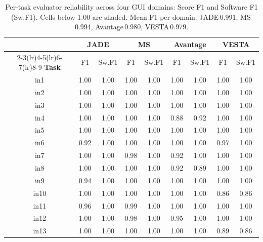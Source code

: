 \documentclass{article}
\begin{document}
\newcommand{\lo}[1]{\cellcolor{subperfect}#1}   %

\begin{table}[htbp]
\centering
\caption{Per-task evaluator reliability across four GUI domains: Score F1 and Software F1 (Sw.F1).
  Cells below 1.00 are shaded. Mean F1 per domain: JADE\,0.991, MS\,0.994, Avantage\,0.980, VESTA\,0.979.}
\label{tab:per_task_detail}
\small
\setlength{\tabcolsep}{5pt}
\begin{tabular}{c cc cc cc cc}
\toprule
 & \multicolumn{2}{c}{\textbf{JADE}}
 & \multicolumn{2}{c}{\textbf{MS}}
 & \multicolumn{2}{c}{\textbf{Avantage}}
 & \multicolumn{2}{c}{\textbf{VESTA}} \\
\cmidrule(lr){2-3}\cmidrule(lr){4-5}\cmidrule(lr){6-7}\cmidrule(lr){8-9}
\textbf{Task} & F1 & Sw.F1 & F1 & Sw.F1 & F1 & Sw.F1 & F1 & Sw.F1 \\
\midrule
in1  & 1.00 & 1.00 & 1.00 & 1.00 & 1.00 & 1.00 & 1.00 & 1.00 \\
in2  & 1.00 & 1.00 & 1.00 & 1.00 & 1.00 & 1.00 & 1.00 & 1.00 \\
in3  & 1.00 & 1.00 & 1.00 & 1.00 & 1.00 & 1.00 & 1.00 & 1.00 \\
in4  & 1.00 & 1.00 & 1.00 & 1.00 & \lo{0.88} & \lo{0.92} & 1.00 & 1.00 \\
in5  & 1.00 & 1.00 & 1.00 & 1.00 & 1.00 & 1.00 & 1.00 & 1.00 \\
in6  & \lo{0.92} & 1.00 & 1.00 & 1.00 & 1.00 & 1.00 & \lo{0.97} & 1.00 \\
in7  & 1.00 & 1.00 & \lo{0.98} & 1.00 & \lo{0.92} & 1.00 & 1.00 & 1.00 \\
in8  & 1.00 & 1.00 & 1.00 & 1.00 & \lo{0.92} & \lo{0.89} & 1.00 & 1.00 \\
in9  & \lo{0.94} & 1.00 & 1.00 & 1.00 & 1.00 & 1.00 & 1.00 & 1.00 \\
in10 & 1.00 & 1.00 & 1.00 & 1.00 & 1.00 & 1.00 & \lo{0.86} & \lo{0.86} \\
in11 & \lo{0.96} & 1.00 & \lo{0.99} & 1.00 & 1.00 & 1.00 & 1.00 & 1.00 \\
in12 & 1.00 & 1.00 & \lo{0.98} & 1.00 & \lo{0.95} & 1.00 & 1.00 & 1.00 \\
in13 & 1.00 & 1.00 & 1.00 & 1.00 & 1.00 & 1.00 & \lo{0.89} & \lo{0.86} \\

\end{tabular}
\end{table}
\end{document}

